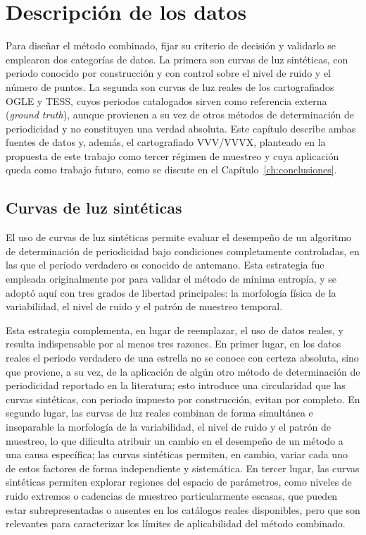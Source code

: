 \documentclass[12pt,letterpaper,oneside]{book}
\begin{document}
\chapter{Descripci\'on de los datos}
\label{ch:datos}

Para dise\~nar el m\'etodo combinado, fijar su criterio de decisi\'on y validarlo se emplearon dos categor\'ias de datos. La primera son curvas de luz sint\'eticas, con periodo conocido por construcci\'on y con control sobre el nivel de ruido y el n\'umero de puntos. La segunda son curvas de luz reales de los cartografiados OGLE y TESS, cuyos periodos catalogados sirven como referencia externa (\emph{ground truth}), aunque provienen a su vez de otros m\'etodos de determinaci\'on de periodicidad y no constituyen una verdad absoluta. Este cap\'itulo describe ambas fuentes de datos y, adem\'as, el cartografiado VVV/VVVX, planteado en la propuesta de este trabajo como tercer r\'egimen de muestreo y cuya aplicaci\'on queda como trabajo futuro, como se discute en el Cap\'itulo~\ref{ch:conclusiones}.

\section{Curvas de luz sint\'eticas}
\label{sec:datos-sinteticas}

El uso de curvas de luz sint\'eticas permite evaluar el desempe\~no de un algoritmo de determinaci\'on de periodicidad bajo condiciones completamente controladas, en las que el periodo verdadero es conocido de antemano. Esta estrategia fue empleada originalmente por \citet{cincotta_1995} para validar el m\'etodo de m\'inima entrop\'ia, y se adopt\'o aqu\'i con tres grados de libertad principales: la morfolog\'ia f\'isica de la variabilidad, el nivel de ruido y el patr\'on de muestreo temporal.

Esta estrategia complementa, en lugar de reemplazar, el uso de datos reales, y resulta indispensable por al menos tres razones. En primer lugar, en los datos reales el periodo verdadero de una estrella no se conoce con certeza absoluta, sino que proviene, a su vez, de la aplicaci\'on de alg\'un otro m\'etodo de determinaci\'on de periodicidad reportado en la literatura; esto introduce una circularidad que las curvas sint\'eticas, con periodo impuesto por construcci\'on, evitan por completo. En segundo lugar, las curvas de luz reales combinan de forma simult\'anea e inseparable la morfolog\'ia de la variabilidad, el nivel de ruido y el patr\'on de muestreo, lo que dificulta atribuir un cambio en el desempe\~no de un m\'etodo a una causa espec\'ifica; las curvas sint\'eticas permiten, en cambio, variar cada uno de estos factores de forma independiente y sistem\'atica. En tercer lugar, las curvas sint\'eticas permiten explorar regiones del espacio de par\'ametros, como niveles de ruido extremos o cadencias de muestreo particularmente escasas, que pueden estar subrepresentadas o ausentes en los cat\'alogos reales disponibles, pero que son relevantes para caracterizar los l\'imites de aplicabilidad del m\'etodo combinado.
\end{document}
